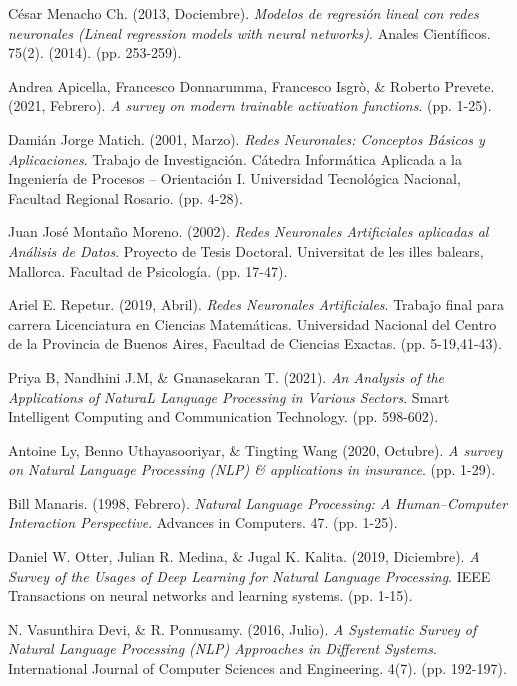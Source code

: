 \documentclass[12pt,a4paper]{article}
\begin{document}
\begin{sloppypar}
\begin{thebibliography}{9}
César Menacho Ch. (2013, Dociembre). \textit{Modelos de regresión lineal con redes neuronales (Lineal regression models with neural networks)}. Anales Científicos. 75(2). (2014). (pp. 253-259).

Andrea Apicella, Francesco Donnarumma, Francesco Isgrò, \& Roberto Prevete. (2021, Febrero). \textit{A survey on modern trainable activation functions}. (pp. 1-25).

Damián Jorge Matich. (2001, Marzo). \textit{Redes Neuronales: Conceptos Básicos y Aplicaciones}. Trabajo de Investigación. Cátedra Informática Aplicada a la Ingeniería de Procesos – Orientación I. Universidad Tecnológica Nacional, Facultad Regional Rosario. (pp. 4-28).

Juan José Montaño Moreno. (2002). \textit{Redes Neuronales Artificiales aplicadas al Análisis de Datos}. Proyecto de Tesis Doctoral. Universitat de les illes balears, Mallorca. Facultad de Psicología. (pp. 17-47).

Ariel E. Repetur. (2019, Abril). \textit{Redes Neuronales Artificiales}. Trabajo final para carrera {Licenciatura en Ciencias Matemáticas}. Universidad Nacional del Centro de la Provincia de Buenos Aires, Facultad de Ciencias Exactas. (pp. 5-19,41-43).

Priya B, Nandhini J.M, \& Gnanasekaran T. (2021). \textit{An Analysis of the Applications of NaturaL Language Processing in Various Sectors}. Smart Intelligent Computing and Communication Technology. (pp. 598-602).

Antoine Ly, Benno Uthayasooriyar, \& Tingting Wang (2020, Octubre). \textit{A survey on Natural Language Processing (NLP) \& applications in insurance}. (pp. 1-29).

Bill Manaris. (1998, Febrero). \textit{Natural Language Processing: A Human–Computer Interaction Perspective}. Advances in Computers. 47. (pp. 1-25).

Daniel W. Otter, Julian R. Medina, \& Jugal K. Kalita. (2019, Diciembre). \textit{A Survey of the Usages of Deep Learning for Natural Language Processing}. IEEE Transactions on neural networks and learning systems. (pp. 1-15).

N. Vasunthira Devi, \& R. Ponnusamy. (2016, Julio). \textit{A Systematic Survey of Natural Language Processing (NLP) Approaches in Different Systems}. International Journal of Computer Sciences and Engineering. 4(7). (pp. 192-197).


\end{thebibliography}
\end{sloppypar}
\end{document}
